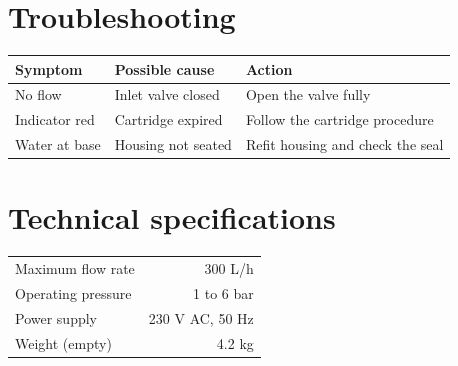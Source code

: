 \documentclass[10pt,a4paper]{report}
\begin{document}
\chapter{Troubleshooting}
\begin{tabularx}{\linewidth}{@{}lXX@{}}
\toprule
Symptom & Possible cause & Action \\
\midrule
No flow & Inlet valve closed & Open the valve fully \\
Indicator red & Cartridge expired & Follow the cartridge procedure \\
Water at base & Housing not seated & Refit housing and check the seal \\
\bottomrule
\end{tabularx}

\appendix
\chapter{Technical specifications}
\begin{tabularx}{0.7\linewidth}{@{}Xr@{}}
\toprule
Maximum flow rate & 300 L/h \\
Operating pressure & 1 to 6 bar \\
Power supply & 230 V AC, 50 Hz \\
Weight (empty) & 4.2 kg \\
\bottomrule
\end{tabularx}
\end{document}
